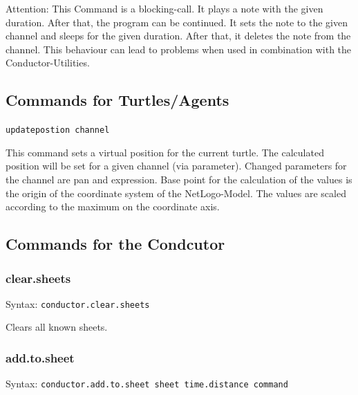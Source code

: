 \documentclass[10pt,a4paper]{article}
\begin{document}
\begin{emph}Attention:
	This Command is a blocking-call. It plays a note with the given duration.
	After that, the program can be continued. It sets the note to the given
	channel and sleeps for the given duration. After that, it deletes the note
	from the channel. This behaviour can lead to problems when used in 
	combination with the Conductor-Utilities. 
\end{emph}

\subsection{Commands for Turtles/Agents}
\lstinline|updatepostion channel| 

This command sets a virtual position for the current turtle. The calculated
position will be set for a given channel (via parameter). Changed parameters
for the channel are pan and expression. Base point for the calculation of the
values is the origin of the coordinate system of the NetLogo-Model. The values
are scaled according to the maximum on the coordinate axis. 


\subsection{Commands for the Condcutor}
\subsubsection{clear.sheets}
Syntax: \lstinline|conductor.clear.sheets|

Clears all known sheets. 
\subsubsection{add.to.sheet}
Syntax: \lstinline|conductor.add.to.sheet sheet time.distance command|
\end{document}

